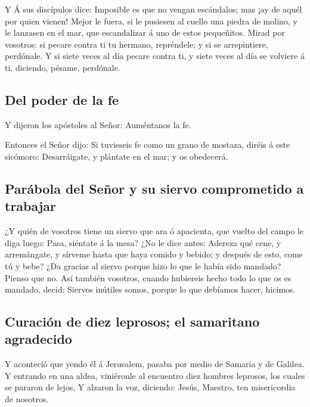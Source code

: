  Y Á sus discípulos dice: Imposible es que no vengan
escándalos; mas ¡ay de aquél por quien vienen!  Mejor le
fuera, si le pusiesen al cuello una piedra de molino, y le lanzasen en
el mar, que escandalizar á uno de estos pequeñitos.  Mirad
por vosotros: si pecare contra ti tu hermano, repréndele; y si se
arrepintiere, perdónale.  Y si siete veces al día pecare
contra ti, y siete veces al día se volviere á ti, diciendo, pésame,
perdónale.

\hypertarget{del-poder-de-la-fe}{%
\subsection{Del poder de la fe}\label{del-poder-de-la-fe}}

 Y dijeron los apóstoles al Señor: Auméntanos la fe.

 Entonces el Señor dijo: Si tuvieseis fe como un grano de
mostaza, diréis á este sicómoro: Desarráigate, y plántate en el mar; y
os obedecerá.

\hypertarget{paruxe1bola-del-seuxf1or-y-su-siervo-comprometido-a-trabajar}{%
\subsection{Parábola del Señor y su siervo comprometido a
trabajar}\label{paruxe1bola-del-seuxf1or-y-su-siervo-comprometido-a-trabajar}}

 ¿Y quién de vosotros tiene un siervo que ara ó apacienta,
que vuelto del campo le diga luego: Pasa, siéntate á la mesa?
 ¿No le dice antes: Adereza qué cene, y arremángate, y
sírveme hasta que haya comido y bebido; y después de esto, come tú y
bebe?  ¿Da gracias al siervo porque hizo lo que le había
sido mandado? Pienso que no.  Así también vosotros,
cuando hubiereis hecho todo lo que os es mandado, decid: Siervos
inútiles somos, porque lo que debíamos hacer, hicimos.

\hypertarget{curaciuxf3n-de-diez-leprosos-el-samaritano-agradecido}{%
\subsection{Curación de diez leprosos; el samaritano
agradecido}\label{curaciuxf3n-de-diez-leprosos-el-samaritano-agradecido}}

 Y aconteció que yendo él á Jerusalem, pasaba por medio
de Samaria y de Galilea.  Y entrando en una aldea,
viniéronle al encuentro diez hombres leprosos, los cuales se pararon de
lejos,  Y alzaron la voz, diciendo: Jesús, Maestro, ten
misericordia de nosotros.


